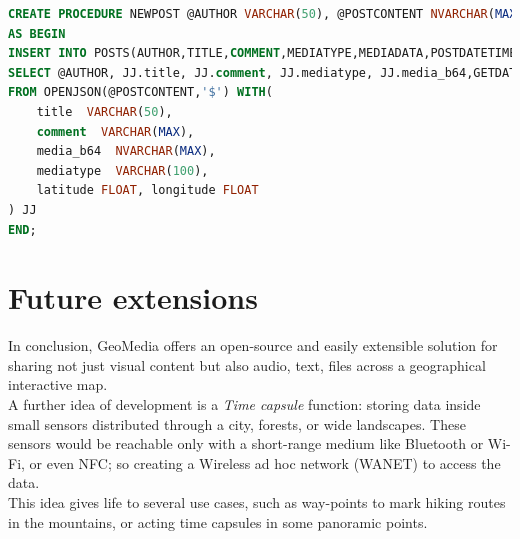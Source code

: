 \documentclass[conference]{IEEEtran}
\begin{document}
\begin{lstlisting}[language=SQL, caption=Stored Procedure of post creation]
CREATE PROCEDURE NEWPOST @AUTHOR VARCHAR(50), @POSTCONTENT NVARCHAR(MAX)
AS BEGIN
INSERT INTO POSTS(AUTHOR,TITLE,COMMENT,MEDIATYPE,MEDIADATA,POSTDATETIME, LATITUDE, LONGITUDE)
SELECT @AUTHOR, JJ.title, JJ.comment, JJ.mediatype, JJ.media_b64,GETDATE(), JJ.latitude ,JJ.longitude 
FROM OPENJSON(@POSTCONTENT,'$') WITH(
	title  VARCHAR(50),
	comment  VARCHAR(MAX),
	media_b64  NVARCHAR(MAX),
	mediatype  VARCHAR(100),
	latitude FLOAT, longitude FLOAT
) JJ
END;
\end{lstlisting}


\section{Future extensions}

In conclusion, GeoMedia offers an open-source and easily extensible solution for sharing not just visual content but also audio, text, files across a geographical interactive map.
\\
A further idea of development is a \textit{Time capsule} function: storing data inside small sensors distributed through a city, forests, or wide landscapes.
These sensors would be reachable only with a short-range medium like Bluetooth or Wi-Fi, or even NFC; so creating a Wireless ad hoc network (WANET) to access the data.
\\
This idea gives life to several use cases, such as way-points to mark hiking routes in the mountains, or acting time capsules in some panoramic points.
\end{document}
